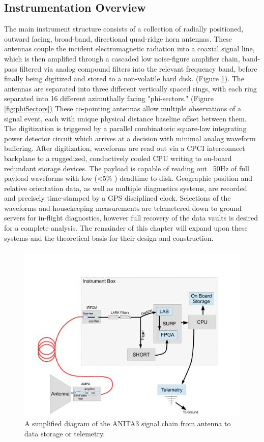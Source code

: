 	
	\subsection{Instrumentation Overview}
	The main instrument structure consists of a collection of radially positioned, outward facing, broad-band, directional quad-ridge horn antennas.  These antennas couple the incident electromagnetic radiation into a coaxial signal line, which is then amplified through a cascaded low noise-figure amplifier chain, band-pass filtered via analog compound filters into the relevant frequency band, before finally being digitized and stored to a non-volatile hard disk. (Figure \ref{fig:RFChainBlockDiagram}).  The antennas are separated into three different vertically spaced rings, with each ring separated into 16 different azimuthally facing "phi-sectors." (Figure \ref{fig:phiSectors})  These co-pointing antennas allow multiple observations of a signal event, each with unique physical distance baseline offset between them.   The digitization is triggered by a parallel combinatoric square-law integrating power detector circuit which arrives at a decision with minimal analog waveform buffering.  After digitization, waveforms are read out via a CPCI interconnect backplane to a ruggedized, conductively cooled CPU writing to on-board redundant storage devices.  The payload is capable of reading out ~50Hz of full payload waveforms with low (\textless 5\% ) deadtime to disk.  Geographic position and relative orientation data, as well as multiple diagnostics systems, are recorded and precisely time-stamped by a GPS disciplined clock.  Selections of the waveforms and housekeeping measurements are telemetered down to ground servers for in-flight diagnostics, however full recovery of the data vaults is desired for a complete analysis.  The remainder of this chapter will expand upon these systems and the theoretical basis for their design and construction.
	
	
\begin{figure}
\centering
	\includegraphics[width=\textwidth]{figures/RFChainBlockDiagram}
	\caption{A simplified diagram of the ANITA3 signal chain from antenna to data storage or telemetry.}
	\label{fig:RFChainBlockDiagram}
\end{figure}

